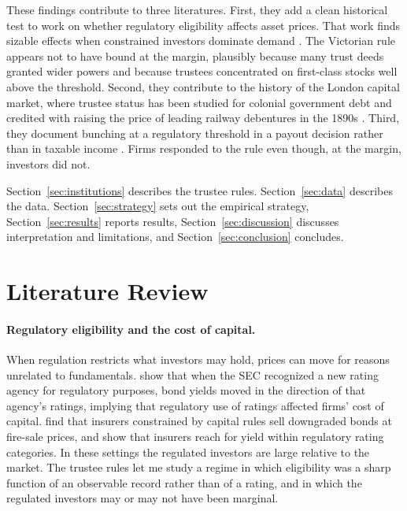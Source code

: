 \documentclass[11pt]{article}
\begin{document}
These findings contribute to three literatures. First, they add a clean historical test to work on whether regulatory eligibility affects asset prices. That work finds sizable effects when constrained investors dominate demand \citep{KisgenStrahan2010, EllulJotikasthiraLundblad2011, BeckerIvashina2015}. The Victorian rule appears not to have bound at the margin, plausibly because many trust deeds granted wider powers and because trustees concentrated on first-class stocks well above the threshold. Second, they contribute to the history of the London capital market, where trustee status has been studied for colonial government debt \citep{ChavazFlandreau2017} and credited with raising the price of leading railway debentures in the 1890s \citep{ChambersCrafts}. Third, they document bunching at a regulatory threshold in a payout decision rather than in taxable income \citep{Kleven2016}. Firms responded to the rule even though, at the margin, investors did not.

Section~\ref{sec:institutions} describes the trustee rules. Section~\ref{sec:data} describes the data. Section~\ref{sec:strategy} sets out the empirical strategy, Section~\ref{sec:results} reports results, Section~\ref{sec:discussion} discusses interpretation and limitations, and Section~\ref{sec:conclusion} concludes.

\section{Literature Review}

\paragraph{Regulatory eligibility and the cost of capital.} When regulation restricts what investors may hold, prices can move for reasons unrelated to fundamentals. \citet{KisgenStrahan2010} show that when the SEC recognized a new rating agency for regulatory purposes, bond yields moved in the direction of that agency's ratings, implying that regulatory use of ratings affected firms' cost of capital. \citet{EllulJotikasthiraLundblad2011} find that insurers constrained by capital rules sell downgraded bonds at fire-sale prices, and \citet{BeckerIvashina2015} show that insurers reach for yield within regulatory rating categories. In these settings the regulated investors are large relative to the market. The trustee rules let me study a regime in which eligibility was a sharp function of an observable record rather than of a rating, and in which the regulated investors may or may not have been marginal.
\end{document}
